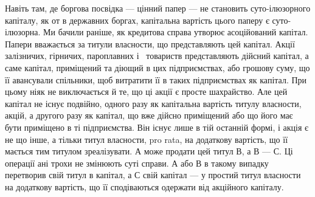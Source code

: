 Навіть там, де боргова посвідка — цінний папер — не становить суто-ілюзорного
капіталу, як от в державних боргах, капітальна вартість цього
паперу є суто-ілюзорна. Ми бачили раніше, як кредитова справа утворює асоційований
капітал. Папери вважається за титули власности, що представляють
цей капітал. Акції залізничих, гірничих, пароплавних і~ товариств представляють
дійсний капітал, а саме капітал, приміщений та діющий в цих
підприємствах, або грошову суму, що її авансували спільники, щоб витратити
її в таких підприємствах як капітал. При цьому ніяк не виключається й те,
що ці акції є просте шахрайство. Але цей капітал не існує подвійно, одного
разу як капітальна вартість титулу власности, акцій, а другого разу як капітал,
що вже дійсно приміщений або що його має бути приміщено в ті підприємства.
Він існує лише в тій останній формі, і акція є не що інше, а
тільки титул власности, pro rata, на додаткову вартість, що її мається тим
титулом зреалізувати. А може продати цей титул В, а В — С. Ці операції ані
трохи не змінюють суті справи. А або В в такому випадку перетворив свій
титул в капітал, а С свій капітал — у простий титул власности на додаткову
вартість, що її сподіваються одержати від акційного капіталу.
